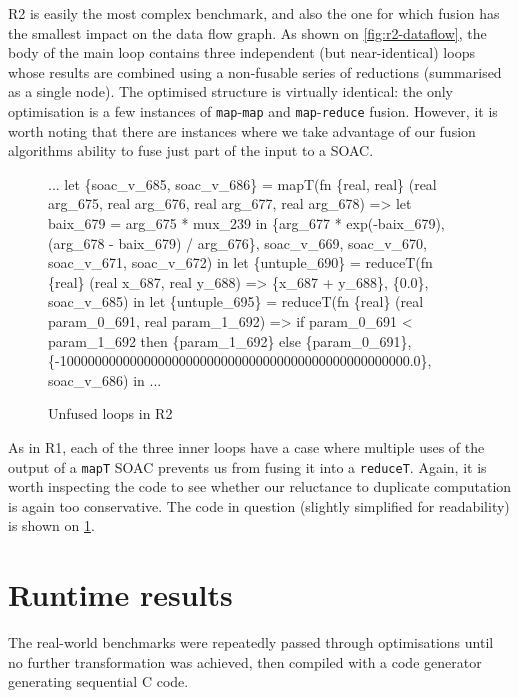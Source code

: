 R2 is easily the most complex benchmark, and also the one for which
fusion has the smallest impact on the data flow graph.  As shown on
\cref{fig:r2-dataflow}, the body of the main loop contains three
independent (but near-identical) loops whose results are combined
using a non-fusable series of reductions (summarised as a single
node).  The optimised structure is virtually identical: the only
optimisation is a few instances of \texttt{map}-\texttt{map} and
\texttt{map}-\texttt{reduce} fusion.  However, it is worth noting that
there are instances where we take advantage of our fusion algorithms
ability to fuse just part of the input to a SOAC.

\begin{figure}
\begin{center}
\begin{bcolorcode}
...
let \{soac_v_685, soac_v_686\} =
  mapT(fn \{real, real\} (real arg_675, real arg_676, real arg_677, real arg_678) =>
         let baix_679 = arg_675 * mux_239 in
         \{arg_677 * exp(-baix_679), (arg_678 - baix_679) / arg_676\},
       soac_v_669, soac_v_670, soac_v_671, soac_v_672) in
let \{untuple_690\} =
  reduceT(fn \{real\} (real x_687, real y_688) =>
            \{x_687 + y_688\},
          \{0.0\}, soac_v_685) in
let \{untuple_695\} =
  reduceT(fn \{real\} (real param_0_691, real param_1_692) =>
            if param_0_691 < param_1_692
            then \{param_1_692\}
            else \{param_0_691\},
          \{-10000000000000000000000000000000000000000000000000.0\},
          soac_v_686) in
...
\end{bcolorcode}
\end{center}
\caption{Unfused loops in R2}
\label{fig:r2-unfused-loops}
\end{figure}

As in R1, each of the three inner loops have a case where multiple
uses of the output of a \texttt{mapT} SOAC prevents us from fusing it
into a \texttt{reduceT}.  Again, it is worth inspecting the code to
see whether our reluctance to duplicate computation is again too
conservative.  The code in question (slightly simplified for
readability) is shown on \cref{fig:r2-unfused-loops}.



\section{Runtime results}
\label{sec:runtime-results}

The real-world benchmarks were repeatedly passed through \LO{}
optimisations until no further transformation was achieved, then
compiled with a code generator generating sequential C code.

